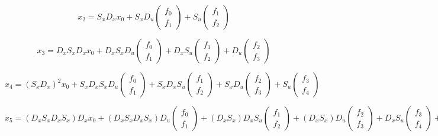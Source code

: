 \documentclass[10pt,a4paper]{article}
\begin{document}
\begin{equation}
x_2=
S_xD_xx_0+
S_xD_u\begin{pmatrix} f_0 \\ f_1 \end{pmatrix}+
S_u\begin{pmatrix} f_1 \\ f_2 \end{pmatrix}
\end{equation}

\begin{equation}
x_3=
D_xS_xD_xx_0+
D_xS_xD_u\begin{pmatrix} f_0 \\ f_1 \end{pmatrix}+
D_xS_u\begin{pmatrix} f_1 \\ f_2 \end{pmatrix}+
D_u\begin{pmatrix} f_2 \\ f_3 \end{pmatrix}
\end{equation}

\begin{equation}
x_4=
(S_xD_x)^2x_0+
S_xD_xS_xD_u\begin{pmatrix} f_0 \\ f_1 \end{pmatrix}+
S_xD_xS_u\begin{pmatrix} f_1 \\ f_2 \end{pmatrix}+
S_xD_u\begin{pmatrix} f_2 \\ f_3 \end{pmatrix}+
S_u\begin{pmatrix} f_3 \\ f_4 \end{pmatrix}
\end{equation}

\begin{equation}
x_5=
(D_xS_xD_xS_x)D_xx_0+
(D_xS_xD_xS_x)D_u\begin{pmatrix} f_0 \\ f_1 \end{pmatrix}+
(D_xS_x)D_xS_u\begin{pmatrix} f_1 \\ f_2 \end{pmatrix}+
(D_xS_x)D_u\begin{pmatrix} f_2 \\ f_3 \end{pmatrix}+
D_xS_u\begin{pmatrix} f_3 \\ f_4 \end{pmatrix}+
D_u\begin{pmatrix} f_4 \\ f_5 \end{pmatrix}
\end{equation}
\end{document}
